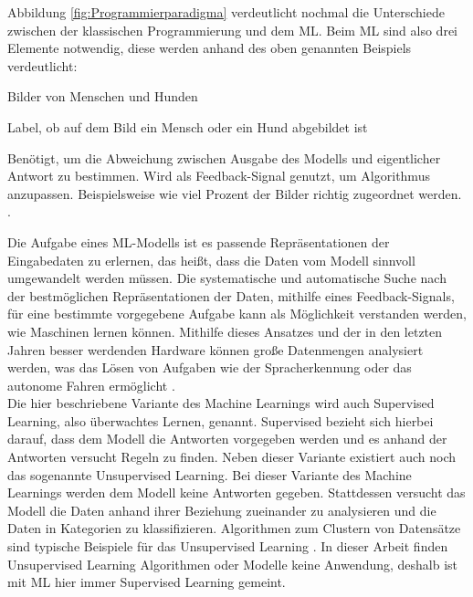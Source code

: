 Abbildung \ref*{fig:Programmierparadigma} verdeutlicht nochmal die Unterschiede zwischen der klassischen Programmierung und dem \ac{ML}. Beim \ac{ML} sind also drei Elemente
notwendig, diese werden anhand des oben genannten Beispiels verdeutlicht: 

\begin{description}[style=multiline,leftmargin=3cm,font=\bfseries]
    \item[Eingabedaten] Bilder von Menschen und Hunden \cite[S.24]{DL_PY}
    \item[Antworten] Label, ob auf dem Bild ein Mensch oder ein Hund abgebildet ist \cite[S.24]{DL_PY}
    \item[Metrik zur Bewertung des Algorithmus] Benötigt, um die Abweichung zwischen Ausgabe des Modells und eigentlicher Antwort zu bestimmen. Wird als Feedback-Signal genutzt,
    um Algorithmus anzupassen. Beispielsweise wie viel Prozent der Bilder richtig zugeordnet werden. \cite[S.24f.]{DL_PY}.  
\end{description}

Die Aufgabe eines \ac{ML}-Modells ist es passende Repräsentationen der Eingabedaten zu erlernen, das heißt, dass die Daten vom Modell sinnvoll umgewandelt werden müssen. 
Die systematische und automatische Suche nach der bestmöglichen Repräsentationen der Daten, mithilfe eines Feedback-Signals, für eine bestimmte vorgegebene Aufgabe kann als Möglichkeit verstanden werden, wie 
Maschinen lernen können. Mithilfe dieses Ansatzes und der in den letzten Jahren besser werdenden Hardware können große Datenmengen analysiert werden, was das Lösen von Aufgaben wie der Spracherkennung 
oder das autonome Fahren ermöglicht \cite[vgl. S.24ff.]{DL_PY}.\\

Die hier beschriebene Variante des Machine Learnings wird auch Supervised Learning, also überwachtes Lernen, genannt. \glqq Supervised\grqq{} bezieht sich hierbei darauf, dass
dem Modell die Antworten vorgegeben werden und es anhand der Antworten versucht Regeln zu finden. Neben dieser Variante existiert auch noch das sogenannte
Unsupervised Learning. Bei dieser Variante des Machine Learnings werden dem Modell keine Antworten gegeben. Stattdessen versucht das Modell die Daten anhand ihrer
Beziehung zueinander zu analysieren und die Daten in Kategorien zu klassifizieren. Algorithmen zum Clustern von Datensätze sind typische Beispiele für das Unsupervised Learning
\cite[vgl. S.47ff.]{AI_Huawei}. In dieser Arbeit finden Unsupervised Learning Algorithmen oder Modelle keine Anwendung, deshalb ist mit \ac{ML} hier immer Supervised Learning gemeint.

